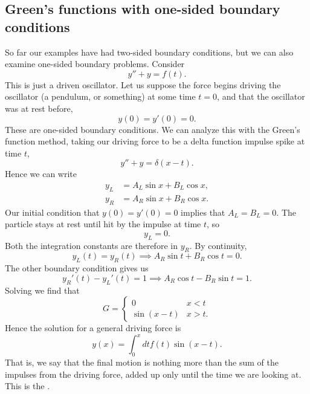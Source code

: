 
\subsection*{Green's functions with one-sided boundary conditions}
So far our examples have had two-sided boundary conditions, but we can also examine one-sided boundary problems. Consider
\begin{equation}
    y''+y = f(t).
\end{equation}
This is just a driven oscillator. Let us suppose the force begins driving the oscillator (a pendulum, or something) at some time $t=0$, and that the oscillator was at rest before,
\begin{equation}
    y(0) = y'(0) = 0.
\end{equation}
These are one-sided boundary conditions. We can analyze this with the Green's function method, taking our driving force to be a delta function impulse spike at time $t$,
\begin{equation}
    y''+y = \delta(x-t).
\end{equation}
Hence we can write
\begin{align}
    y_L &= A_L \sin x + B_L \cos x,\\
    y_R &= A_R \sin x + B_R \cos x.
\end{align}
Our initial condition that $y(0)= y'(0)=0$ implies that $A_L=B_L=0$. The particle stays at rest until hit by the impulse at time $t$, so
\begin{equation}
    y_L= 0.
\end{equation}
Both the integration constants are therefore in $y_R$. By continuity,
\begin{equation}
    y_L(t) = y_R(t) \implies A_R \sin t + B_R \cos t = 0.
\end{equation}
The other boundary condition gives us
\begin{equation}
    y_R'(t) - y_L'(t) = 1 \implies A_R \cos t  -B_R \sin t =1.
\end{equation}
Solving we find that
\begin{equation}
    G = \begin{cases}
        0 & x < t\\
        \sin(x-t) & x > t.
    \end{cases}
\end{equation}
Hence the solution for a general driving force is
\begin{equation}
    y(x) = \int_0^x dt f(t) \sin(x-t).
\end{equation}
That is, we say that the final motion is nothing more than the sum of the impulses from the driving force, added up only until the time we are looking at. This is the .

